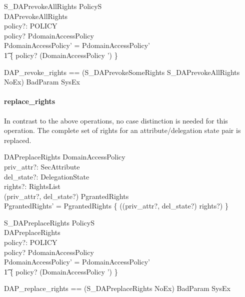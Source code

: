 \begin{schema}{S\_DAPrevokeAllRights}
  \Delta PolicyS \\
  DAPrevokeAllRights \\
  policy?: POLICY \\
  \where
  policy? \in \dom PdomainAccessPolicy \\
  PdomainAccessPolicy' = PdomainAccessPolicy' \oplus \\
  \t1 \{ policy? \mapsto (\theta DomainAccessPolicy ') \}\\
\end{schema}
\begin{zed}
  DAP\_revoke\_rights == \< (S\_DAPrevokeSomeRights \lor S\_DAPrevokeAllRights \\
  \land NoEx) \lor BadParam \lor SysEx \>
\end{zed}


\paragraph{replace\_rights}
In contrast to the above operations, no case distinction is needed for this
operation.  The complete set of rights for an attribute/delegation state pair is
replaced.
\begin{schema}{DAPreplaceRights}
  \Delta DomainAccessPolicy \\
  priv\_attr?: SecAttribute \\
  del\_state?: DelegationState \\
  rights?: RightsList \\
  \where
  (priv\_attr?, del\_state?) \in \dom PgrantedRights \\
  PgrantedRights' = PgrantedRights \oplus \{ ((priv\_attr?, del\_state?) \mapsto
  \ran rights?) \} \\
\end{schema}
\begin{schema}{S\_DAPreplaceRights}
  \Delta PolicyS \\
  DAPreplaceRights \\
  policy?: POLICY \\
  \where  
  policy? \in \dom PdomainAccessPolicy \\
  PdomainAccessPolicy' = PdomainAccessPolicy' \oplus \\
  \t1 \{ policy? \mapsto (\theta DomainAccessPolicy ') \}\\ 
\end{schema}
\begin{zed}
  DAP\_replace\_rights == (S\_DAPreplaceRights \land NoEx) \lor BadParam \lor
  SysEx \\
\end{zed}


